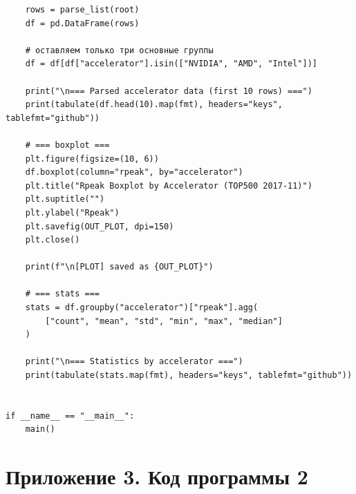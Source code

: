 \documentclass[14pt,a4paper]{extarticle}
\begin{document}
\begin{verbatim}
    rows = parse_list(root)
    df = pd.DataFrame(rows)

    # оставляем только три основные группы
    df = df[df["accelerator"].isin(["NVIDIA", "AMD", "Intel"])]

    print("\n=== Parsed accelerator data (first 10 rows) ===")
    print(tabulate(df.head(10).map(fmt), headers="keys", tablefmt="github"))

    # === boxplot ===
    plt.figure(figsize=(10, 6))
    df.boxplot(column="rpeak", by="accelerator")
    plt.title("Rpeak Boxplot by Accelerator (TOP500 2017-11)")
    plt.suptitle("")
    plt.ylabel("Rpeak")
    plt.savefig(OUT_PLOT, dpi=150)
    plt.close()

    print(f"\n[PLOT] saved as {OUT_PLOT}")

    # === stats ===
    stats = df.groupby("accelerator")["rpeak"].agg(
        ["count", "mean", "std", "min", "max", "median"]
    )

    print("\n=== Statistics by accelerator ===")
    print(tabulate(stats.map(fmt), headers="keys", tablefmt="github"))


if __name__ == "__main__":
    main()
\end{verbatim}

\newpage
\section*{Приложение 3. Код программы 2}
\end{document}
